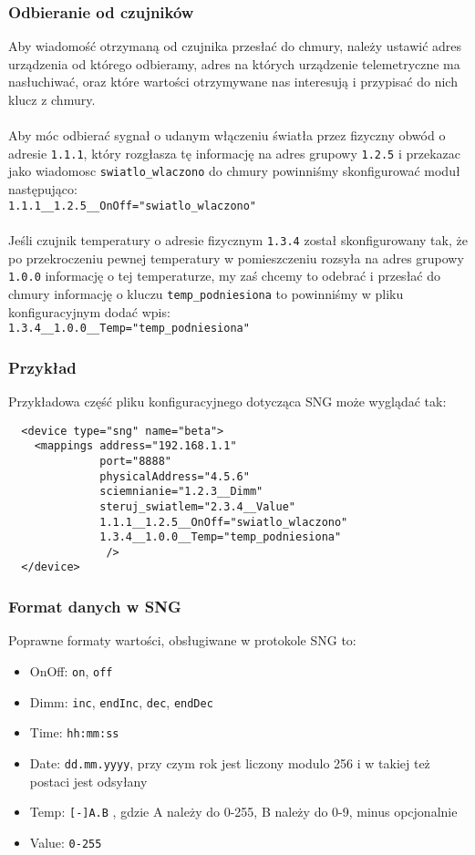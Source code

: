 \documentclass[11pt]{article}
\begin{document}
\subsubsection{Odbieranie od czujników}
Aby wiadomość otrzymaną od czujnika przesłać do chmury, należy ustawić adres urządzenia od którego odbieramy,
adres na których urządzenie telemetryczne ma nasłuchiwać, oraz które wartości otrzymywane nas interesują i 
przypisać do nich klucz z chmury.\\
\\
Aby móc odbierać sygnał o udanym włączeniu światła przez fizyczny obwód o adresie \verb|1.1.1|,
który rozgłasza tę informację na adres grupowy \verb|1.2.5| i przekazac jako wiadomosc 
\verb|swiatlo_wlaczono| do chmury powinniśmy skonfigurować moduł następująco:\\
\verb|1.1.1__1.2.5__OnOff="swiatlo_wlaczono"|\\
\\
Jeśli czujnik temperatury o adresie fizycznym \verb|1.3.4| został skonfigurowany tak, że po przekroczeniu
pewnej temperatury w pomieszczeniu rozsyła na adres grupowy \verb|1.0.0| informację o tej temperaturze,
my zaś chcemy to odebrać i przesłać do chmury informację o kluczu \verb|temp_podniesiona| to powinniśmy w
pliku konfiguracyjnym dodać wpis:\\
\verb|1.3.4__1.0.0__Temp="temp_podniesiona"|  

\subsubsection{Przykład}
Przykładowa część pliku konfiguracyjnego dotycząca SNG może wyglądać tak:
\begin{verbatim}
  <device type="sng" name="beta">
    <mappings address="192.168.1.1"
              port="8888"
              physicalAddress="4.5.6"
              sciemnianie="1.2.3__Dimm"
              steruj_swiatlem="2.3.4__Value"
              1.1.1__1.2.5__OnOff="swiatlo_wlaczono"
              1.3.4__1.0.0__Temp="temp_podniesiona"
               />
  </device>
\end{verbatim}

\subsubsection{Format danych w SNG}
Poprawne formaty wartości, obsługiwane w protokole SNG to:
\begin{itemize}

\item OnOff: \verb|on|, \verb|off|
\item Dimm: \verb|inc|, \verb|endInc|, \verb|dec|, \verb|endDec|
\item Time: \verb|hh:mm:ss|
\item Date: \verb|dd.mm.yyyy|, przy czym rok jest liczony modulo 256 i w takiej też postaci jest odsyłany
\item Temp: \verb|[-]A.B| , gdzie A należy do 0-255, B należy do 0-9,  minus opcjonalnie
\item Value: \verb|0-255| 
\end{itemize}
\end{document}
